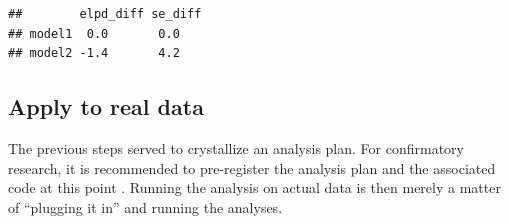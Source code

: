\documentclass[
  american,
]{article}
\newenvironment{Shaded}{\begin{snugshade}}{\end{snugshade}}
\newcommand{\CommentTok}[1]{\textcolor[rgb]{0.56,0.35,0.01}{\textit{#1}}}
\newcommand{\KeywordTok}[1]{\textcolor[rgb]{0.13,0.29,0.53}{\textbf{#1}}}
\newcommand{\NormalTok}[1]{#1}
\newcommand{\OperatorTok}[1]{\textcolor[rgb]{0.81,0.36,0.00}{\textbf{#1}}}
\newcommand{\StringTok}[1]{\textcolor[rgb]{0.31,0.60,0.02}{#1}}
\begin{document}
\begin{Shaded}
\end{Shaded}

\begin{verbatim}
##        elpd_diff se_diff
## model1  0.0       0.0   
## model2 -1.4       4.2
\end{verbatim}

\hypertarget{apply-to-real-data}{%
\subsection{Apply to real data}\label{apply-to-real-data}}

The previous steps served to crystallize an analysis plan. For confirmatory research, it is recommended to pre-register the analysis plan and the associated code at this point \citep{munafo2017}. Running the analysis on actual data is then merely a matter of ``plugging it in'' and running the analyses.
\end{document}
